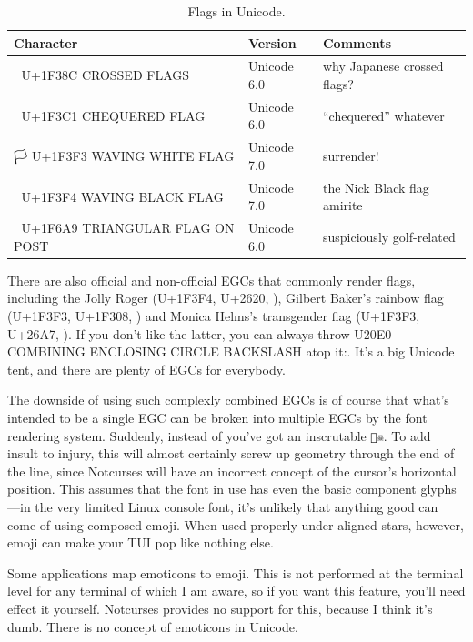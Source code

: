 \begin{table}[!htb]
  \centering
  \begin{tabular}{|l|l|l|}
  \hline
  Character & Version & Comments \\
  \hline
  \hline
  🎌 U+1F38C CROSSED FLAGS & Unicode 6.0 & why Japanese crossed flags? \\
  \hline
  🏁 U+1F3C1 CHEQUERED FLAG & Unicode 6.0 & ``chequered'' whatever \\
  \hline
  🏳 U+1F3F3 WAVING WHITE FLAG & Unicode 7.0 & surrender! \\
  \hline
  🏴  U+1F3F4 WAVING BLACK FLAG & Unicode 7.0 & the Nick Black flag amirite \\
  \hline
  🚩 U+1F6A9 TRIANGULAR FLAG ON POST & Unicode 6.0 & suspiciously golf-related \\
  \hline
  \end{tabular}
  \caption{Flags in Unicode.}
  \label{table:flags}
\end{table}

There are also official and non-official EGCs that commonly render flags, including
the Jolly Roger (U+1F3F4, U+2620, ),
Gilbert Baker's rainbow flag (U+1F3F3, U+1F308, ) and Monica Helms's
transgender flag (U+1F3F3, U+26A7, ).
If you don't like the latter, you can always throw U20E0 COMBINING ENCLOSING
CIRCLE BACKSLASH atop it:. It's a big Unicode tent, and there are plenty
of EGCs for everybody.

The downside of using such complexly combined EGCs is of course that what's
intended to be a single EGC can be broken into multiple EGCs by the font
rendering system. Suddenly, instead of 
you've got an inscrutable \texttt{🏴☠}. To add insult to injury, this will
almost certainly screw up geometry through the end of the line, since Notcurses
will have an incorrect concept of the cursor's horizontal position. This
assumes that the font in use has even the basic component glyphs---in the very
limited Linux console font, it's unlikely that anything good can come of using
composed emoji. When used properly under aligned stars, however, emoji can make
your TUI pop like nothing else.

Some applications map emoticons to emoji. This is not performed at the terminal
level for any terminal of which I am aware, so if you want this feature, you'll
need effect it yourself. Notcurses provides no support for this, because I
think it's dumb. There is no concept of emoticons in Unicode.

